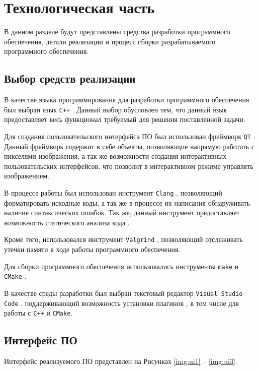 \chapter{Технологическая часть}

В данном разделе будут представлены средства разработки программного обеспечения, детали реализации и процесс сборки разрабатываемого программного обеспечения.

\section{Выбор средств реализации}

В качестве языка программирования для разработки программного обеспечения был выбран язык \texttt{C++} \cite{cpp}. Данный выбор обусловлен тем, что данный язык предоставляет весь функционал требуемый для решения поставленной задачи.

Для создания пользовательского интерфейса ПО был использован фреймворк \texttt{QT} \cite{qt}. Данный фреймворк содержит в себе объекты, позволяющие напрямую работать с пикселями изображения, а  так же возможности создания интерактивных пользовательских интерфейсов, что позволит в интерактивном режиме управлять изображением.

В процессе работы был использован инструмент \texttt{Clang} \cite{clang}, позволяющий форматировать исходные коды, а так же в процессе их написания обнаруживать наличие синтаксических ошибок. Так же, данный инструмент предоставляет возможность статического анализа кода \cite{clang_static}. 

Кроме того, использовался инструмент \texttt{Valgrind} \cite{valgrind}, позволяющий отслеживать утечки памяти в ходе работы программного обеспечения.

Для сборки программного обеспечения использовались инструменты \texttt{make} \cite{make} и \texttt{CMake} \cite{cmake}.

В качестве среды разработки был выбран текстовый редактор \texttt{Visual Studio Code} \cite{vscode}, поддерживающий возможность установки плагинов \cite{vscode_plugins}, в том числе для работы с \texttt{C++} и \texttt{CMake}.

\clearpage
\section{Интерфейс ПО}

Интерфейс реализуемого ПО представлен на Рисунках \ref{img:ui1} -- \ref{img:ui3}.


